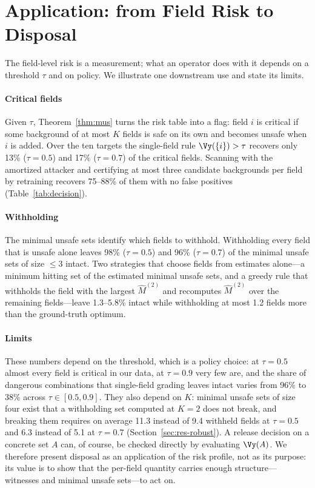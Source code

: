 \section{Application: from Field Risk to Disposal}\label{sec:application}

The field-level risk is a measurement; what an operator does with it depends on a threshold $\tau$
and on policy. We illustrate one downstream use and state its limits.

\paragraph{Critical fields}
Given $\tau$, Theorem~\ref{thm:mus} turns the risk table into a flag: field $i$ is critical if some
background of at most $K$ fields is safe on its own and becomes unsafe when $i$ is added. Over the ten
targets the single-field rule $\Vy(\{i\})>\tau$ recovers only 13\% ($\tau=0.5$) and 17\% ($\tau=0.7$) of
the critical fields. Scanning with the amortized attacker and certifying at most three candidate
backgrounds per field by retraining recovers 75--88\% of them with no false positives
(Table~\ref{tab:decision}).

\paragraph{Withholding}
The minimal unsafe sets identify which fields to withhold. Withholding every field that is unsafe
alone leaves 98\% ($\tau=0.5$) and 96\% ($\tau=0.7$) of the minimal unsafe sets of size $\le3$ intact.
Two strategies that choose fields from estimates alone---a minimum hitting set of the estimated
minimal unsafe sets, and a greedy rule that withholds the field with the largest $\hat M^{(2)}$ and
recomputes $\hat M^{(2)}$ over the remaining fields---leave 1.3--5.8\% intact while withholding at most
1.2 fields more than the ground-truth optimum.

\paragraph{Limits}
These numbers depend on the threshold, which is a policy choice: at $\tau=0.5$ almost every field is
critical in our data, at $\tau=0.9$ very few are, and the share of dangerous combinations that
single-field grading leaves intact varies from 96\% to 38\% across $\tau\in[0.5,0.9]$. They also depend
on $K$: minimal unsafe sets of size four exist that a withholding set computed at $K=2$ does not break,
and breaking them requires on average 11.3 instead of 9.4 withheld fields at $\tau=0.5$ and 6.3 instead
of 5.1 at $\tau=0.7$ (Section~\ref{sec:res-robust}). A release decision on a concrete set $A$ can, of
course, be checked directly by evaluating $\Vy(A)$. We therefore present disposal as an application of
the risk profile, not as its purpose: its value is to show that the per-field quantity carries enough
structure---witnesses and minimal unsafe sets---to act on.


